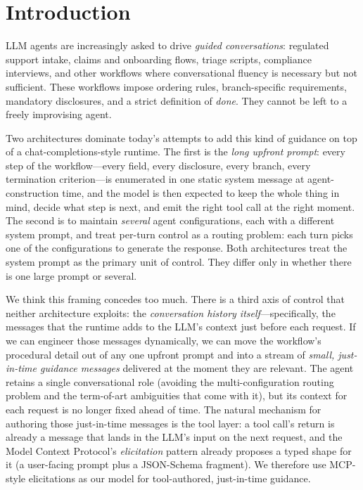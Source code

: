\documentclass[11pt,a4paper]{article}
\begin{document}
\begin{abstract}
procedural detail lives---one upfront blob, one of several upfront blobs, or a sequence of small, just-in-time, tool-authored messages.
\end{abstract}

\section{Introduction}

LLM agents are increasingly asked to drive \emph{guided conversations}: regulated support intake, claims and onboarding flows, triage scripts, compliance interviews, and other workflows where conversational fluency is necessary but not sufficient. These workflows impose ordering rules, branch-specific requirements, mandatory disclosures, and a strict definition of \emph{done}. They cannot be left to a freely improvising agent.

Two architectures dominate today's attempts to add this kind of guidance on top of a chat-completions-style runtime. The first is the \emph{long upfront prompt}: every step of the workflow---every field, every disclosure, every branch, every termination criterion---is enumerated in one static system message at agent-construction time, and the model is then expected to keep the whole thing in mind, decide what step is next, and emit the right tool call at the right moment. The second is to maintain \emph{several} agent configurations, each with a different system prompt, and treat per-turn control as a routing problem: each turn picks one of the configurations to generate the response. Both architectures treat the system prompt as the primary unit of control. They differ only in whether there is one large prompt or several.

We think this framing concedes too much. There is a third axis of control that neither architecture exploits: the \emph{conversation history itself}---specifically, the messages that the runtime adds to the LLM's context just before each request. If we can engineer those messages dynamically, we can move the workflow's procedural detail out of any one upfront prompt and into a stream of \emph{small, just-in-time guidance messages} delivered at the moment they are relevant. The agent retains a single conversational role (avoiding the multi-configuration routing problem and the term-of-art ambiguities that come with it), but its context for each request is no longer fixed ahead of time. The natural mechanism for authoring those just-in-time messages is the tool layer: a tool call's return is already a message that lands in the LLM's input on the next request, and the Model Context Protocol's \emph{elicitation} pattern already proposes a typed shape for it (a user-facing prompt plus a JSON-Schema fragment). We therefore use MCP-style elicitations as our model for tool-authored, just-in-time guidance.
\end{document}
